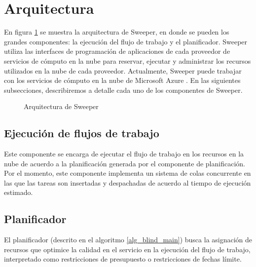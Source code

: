 \section{Arquitectura}

En figura \ref{fig:sweeper-arch} se muestra la arquitectura de Sweeper, en donde se pueden los grandes componentes: la ejecución del flujo de trabajo y el planificador. Sweeper utiliza las interfaces de programación de aplicaciones de cada proveedor de servicios de cómputo en la nube para reservar, ejecutar y administrar los recursos utilizados en la nube de cada proveedor. Actualmente, Sweeper puede trabajar con los servicios de cómputo en la nube de Microsoft Azure \cite{microsoft2015azure}. En las siguientes subsecciones, describiremos a detalle cada uno de los componentes de Sweeper.

\begin{figure}
\begin{center}
\end{center}
\caption{Arquitectura de Sweeper}
\label{fig:sweeper-arch}
\end{figure}


\subsection{Ejecución de flujos de trabajo}

Este componente se encarga de ejecutar el flujo de trabajo en los recursos en la nube de acuerdo a la planificación generada por el componente de planificación. Por el momento, este componente implementa un sistema de colas concurrente en las que las tareas son insertadas y despachadas de acuerdo al tiempo de ejecución estimado.



\subsection{Planificador}

El planificador (descrito en el algoritmo \ref{alg_blind_main}) busca la asignación de recursos que optimice la calidad en el servicio en la ejecución del flujo de trabajo, interpretado como restricciones de presupuesto o restricciones de fechas límite. 




